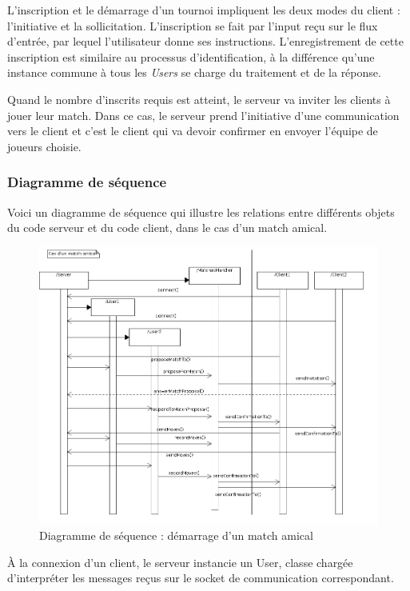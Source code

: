 \documentclass[a4paper,titlepage]{scrreprt}
\begin{document}
    L'inscription et le démarrage d'un tournoi impliquent les deux modes du client : l'initiative et la sollicitation.
    L'inscription se fait par l'input reçu sur le flux d'entrée, par lequel l'utilisateur donne ses instructions.
    L'enregistrement de cette inscription est similaire au processus d'identification, à la différence
    qu'une instance commune à tous les \emph{Users} se charge du traitement et de la réponse.
    
    Quand le nombre d'inscrits requis est atteint, le serveur va inviter les clients à jouer leur match.
    Dans ce cas, le serveur prend l'initiative d'une communication vers le client et c'est le client
    qui va devoir confirmer en envoyer l'équipe de joueurs choisie.
    
    


\subsubsection{Diagramme de séquence}
  Voici un diagramme de séquence qui illustre les relations entre différents objets du code serveur
  et du code client, dans le cas d'un match amical.
    \begin{figure}[H]
    \center
    \includegraphics[scale=0.4]{uml/Sequence_matchStarting.png}
    \caption{Diagramme de séquence : démarrage d'un match amical}
    \end{figure}
  À la connexion d'un client, le serveur instancie un User, classe chargée d'interpréter
  les messages reçus sur le socket de communication correspondant.
\end{document}
